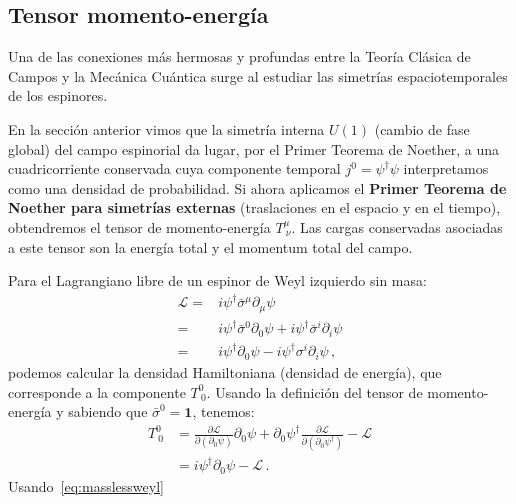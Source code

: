 \subsection{Tensor momento-energía}
\label{sec:tens-momento-energi}
\begin{frame}






Una de las conexiones más hermosas y profundas entre la Teoría Clásica de Campos y la Mecánica Cuántica surge al estudiar las simetrías espaciotemporales de los espinores. 

En la sección anterior vimos que la simetría interna $U(1)$ (cambio de fase global) del campo espinorial da lugar, por el Primer Teorema de Noether, a una cuadricorriente conservada cuya componente temporal $j^0 = \psi^\dagger \psi$ interpretamos como una densidad de probabilidad. Si ahora aplicamos el \textbf{Primer Teorema de Noether para simetrías externas} (traslaciones en el espacio y en el tiempo), obtendremos el tensor de momento-energía $T^\mu_{\ \nu}$. Las cargas conservadas asociadas a este tensor son la energía total y el momentum total del campo.

Para el Lagrangiano libre de un espinor de Weyl izquierdo sin masa:
\begin{align}
  \label{eq:masslessweyl}
  \mathcal{L} =& i\psi^\dagger \bar{\sigma}^\mu \partial_\mu \psi \nonumber\\
  =& i\psi^\dagger \bar{\sigma}^0 \partial_0 \psi + i\psi^\dagger \bar{\sigma}^i \partial_i \psi \nonumber\\
=& i\psi^\dagger  \partial_0 \psi - i\psi^\dagger {\sigma}^i \partial_i \psi   \,,
\end{align}
podemos calcular la densidad Hamiltoniana (densidad de energía), que corresponde a la componente $T^0_{\ 0}$. Usando la definición del tensor de momento-energía y sabiendo que $\bar{\sigma}^0 = \mathbf{1}$, tenemos:
\begin{align}
    T^0_{\ 0} &= \frac{\partial \mathcal{L}}{\partial (\partial_0 \psi)} \partial_0 \psi + \partial_0 \psi^\dagger \frac{\partial \mathcal{L}}{\partial (\partial_0 \psi^\dagger)} - \mathcal{L} \nonumber \\
    &= i\psi^\dagger \partial_0 \psi - \mathcal{L} \, .
\end{align}
Usando~\eqref{eq:masslessweyl} 


\end{frame}
